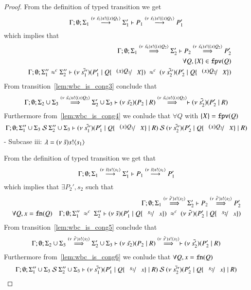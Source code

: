 \begin{proof}
	\noi From the definition of typed transition we get
	\[
		\Gamma; \emptyset; \Sigma_1 \stackrel{(\nu\ \tilde{s_3}) s ! \langle (x)Q_1 \rangle}{\longrightarrow} \Sigma_1' \vdash P_1 \stackrel{(\nu\ \tilde{s_3}) s ! \langle (x)Q_1 \rangle}{\longrightarrow} P_1'
	\]
	\noi which implies that
%
	\begin{eqnarray}
		&&\Gamma; \emptyset; \Sigma_1 \By{\news{\tilde{s_4}} \bactout{s}{\abs{x}{Q_2}}} \Sigma_2' \proves P_2 \By{\news{\tilde{s_4}} \bactout{s}{\abs{x}{Q_2}}} P_2' \label{lem:wbc_is_cong3} \\
		&&\forall Q, \set{X} \in \fpv{Q} \\
		&&\Gamma; \emptyset; \Sigma_1'' \wbc \Sigma_2'' \proves \newsp{\tilde{s_1''}}{P_1' \Par Q \subst{(x) Q_1}{X}}\ \wbc\ \newsp{\tilde{s_2''}}{P_2' \Par Q \subst{(x) Q_2}{X}} \label{lem:wbc_is_cong4}
	\end{eqnarray}
%
	\noi From transition~\ref{lem:wbc_is_cong3} conclude that 
	\[
		\Gamma;\emptyset; \Sigma_2 \cup \Sigma_3 \stackrel{(\nu\ \tilde{s_4}) s ! \langle (x)Q_2 \rangle}{\Longrightarrow} \Sigma_2' \cup \Sigma_3 \vdash (\nu\ \tilde{s_2})(P_2 \;|\; R) \stackrel{(\nu\ \tilde{s_4}) s ! \langle (x)Q_2 \rangle}{\Longrightarrow} \vdash (\nu\ \tilde{s_2'})(P_2' \;|\; R)
	\]
%
	\noi Furthermore from~\ref{lem:wbc_is_cong4} we conlude that $\forall Q$ with $\{X\} = \mathtt{fpv}(Q)$
%
	\[
		\Gamma; \emptyset; \Sigma_1'' \cup \Sigma_3\ \mathcal{S}\ \Sigma_2'' \cup \Sigma_3 \proves \newsp{\tilde{s_1''}}{P_1' \Par Q \subst{(x) Q_1}{X} \Par R}\ \mathcal{S}\ \newsp{\tilde{s_2''}}{P_2' \Par Q \subst{(x) Q_2}{X} \Par R}
	\]
%
	- Subcase iii: $\lambda = (\nu\ \tilde{s}) s ! \langle s_1 \rangle$

	\noi From the definition of typed transition we get that
	\[
		\Gamma; \emptyset; \Sigma_1 \stackrel{(\nu\ \tilde{s}) s ! \langle s_1 \rangle}{\longrightarrow} \Sigma_1' \vdash P_1 \stackrel{(\nu\ \tilde{s}) s ! \langle s_1 \rangle}{\longrightarrow} P_1'
	\]
	\noi which implies that $\exists P_2', s_2$ such that
%
	\begin{eqnarray}
		&& \Gamma; \emptyset; \Sigma_1 \By{\news{\tilde{s'}} \bactout{s}{s_2}} \Sigma_2' \proves P_2 \By{\news{\tilde{s'}} \bactout{s}{s_2}} P_2' \label{lem:wbc_is_cong5}\\
		\forall Q, x = \fn{Q}%
		&&\Gamma; \emptyset; \Sigma_1''\ \wbc\ \Sigma_2'' \proves \newsp{\tilde{s}}{P_1' \Par Q \subst{s_1}{x}}\ \wbc\ \newsp{\tilde{s'}}{P_2' \Par Q \subst{s_2}{x}} \label{lem:wbc_is_cong6}
	\end{eqnarray}
%
	\noi From transition~\ref{lem:wbc_is_cong5} conclude that 
	\[
		\Gamma;\emptyset; \Sigma_2 \cup \Sigma_3 \stackrel{(\nu\ \tilde{s'}) s ! \langle s_2 \rangle}{\Longrightarrow} \Sigma_2' \cup \Sigma_3 \vdash (\nu\ \tilde{s_2})(P_2 \;|\; R) \stackrel{(\nu\ \tilde{s'}) s ! \langle s_2 \rangle}{\Longrightarrow} \vdash (\nu\ \tilde{s_2'})(P_2' \;|\; R)
	\]
%
	\noi Furthermore from~\ref{lem:wbc_is_cong6} we conlude that $\forall Q, x = \mathtt{fn}(Q)$
%
	\[
		\Gamma; \emptyset; \Sigma_1'' \cup \Sigma_3\ \mathcal{S}\ \Sigma_2'' \cup \Sigma_3 \proves \newsp{\tilde{s_1''}}{P_1' \Par Q \subst{s_1}{x} \Par R}\ \mathcal{S}\ \newsp{\tilde{s_2''}}{P_2' \Par Q \subst{s_2}{x} \Par R}
	\]
%


\end{proof}
